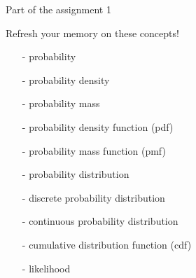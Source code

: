 \documentclass[english,t]{beamer}
\begin{document}
\begin{frame}{Part of the assignment 1}

  Refresh your memory on these concepts!
  \begin{itemize}
  \item[-] probability
  \item[-] probability density
  \item[-] probability mass
  \item[-] probability density function (pdf)
  \item[-] probability mass function (pmf)
  \item[-] probability distribution
  \item[-] discrete probability distribution
  \item[-] continuous probability distribution
  \item[-] cumulative distribution function (cdf)
  \item[-] likelihood
  \end{itemize}
  
\end{frame}
\end{document}
